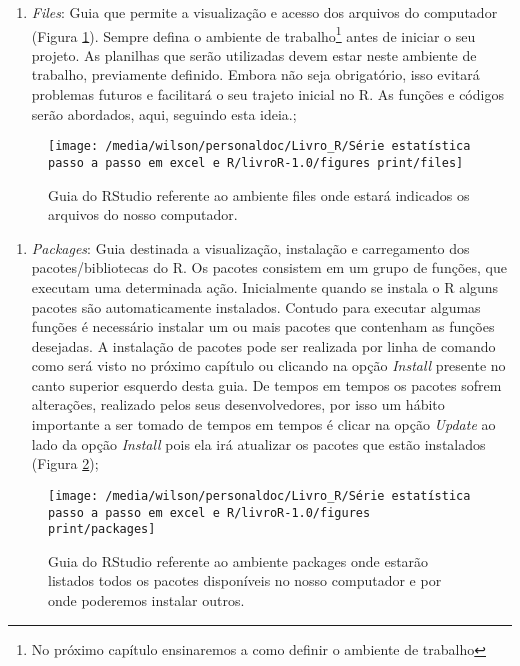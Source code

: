 \documentclass[14pt,titlepage, oneside, openany, a4paper]{book}
\providecommand{\tightlist}{%
  \setlength{\itemsep}{0pt}\setlength{\parskip}{0pt}}
\begin{document}
\begin{enumerate}
\def\labelenumi{\arabic{enumi}.}
\setcounter{enumi}{4}
\tightlist
\item
  \emph{Files}: Guia que permite a visualização e acesso dos arquivos do computador (Figura \ref{fig:files}). Sempre defina o ambiente de trabalho\footnote{No próximo capítulo ensinaremos a como definir o ambiente de trabalho} antes de iniciar o seu projeto. As planilhas que serão utilizadas devem estar neste ambiente de trabalho, previamente definido. Embora não seja obrigatório, isso evitará problemas futuros e facilitará o seu trajeto inicial no R. As funções e códigos serão abordados, aqui, seguindo esta ideia.;
\end{enumerate}

\begin{figure}[H]

{\centering \texttt{[image: /media/wilson/personaldoc/Livro\_R/Série estatística passo a passo em excel e R/livroR-1.0/figures print/files]} 

}

\caption{Guia do RStudio referente ao ambiente files onde estará indicados os arquivos do nosso computador.}\label{fig:files}
\end{figure}

\begin{enumerate}
\def\labelenumi{\arabic{enumi}.}
\setcounter{enumi}{5}
\tightlist
\item
  \emph{Packages}: Guia destinada a visualização, instalação e carregamento dos pacotes/bibliotecas do R. Os pacotes consistem em um grupo de funções, que executam uma determinada ação. Inicialmente quando se instala o R alguns pacotes são automaticamente instalados. Contudo para executar algumas funções é necessário instalar um ou mais pacotes que contenham as funções desejadas. A instalação de pacotes pode ser realizada por linha de comando como será visto no próximo capítulo ou clicando na opção \emph{Install} presente no canto superior esquerdo desta guia. De tempos em tempos os pacotes sofrem alterações, realizado pelos seus desenvolvedores, por isso um hábito importante a ser tomado de tempos em tempos é clicar na opção \emph{Update} ao lado da opção \emph{Install} pois ela irá atualizar os pacotes que estão instalados (Figura \ref{fig:packages});
\end{enumerate}

\begin{figure}[H]

{\centering \texttt{[image: /media/wilson/personaldoc/Livro\_R/Série estatística passo a passo em excel e R/livroR-1.0/figures print/packages]} 

}

\caption{Guia do RStudio referente ao ambiente packages onde estarão listados todos os pacotes disponíveis no nosso computador e por onde poderemos instalar outros.}\label{fig:packages}
\end{figure}
\end{document}
